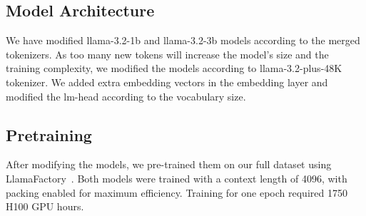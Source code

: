 


\subsection{Model Architecture}
We have modified llama-3.2-1b and llama-3.2-3b models according to the merged tokenizers. As too many new tokens will increase the model's size and the training complexity, we modified the models according to llama-3.2-plus-48K tokenizer. We added extra embedding vectors in the embedding layer and modified the lm-head according to the vocabulary size.

\subsection{Pretraining}
After modifying the models, we pre-trained them on our full dataset using LlamaFactory~\cite{zheng2024llamafactory}. Both models were trained with a context length of 4096, with packing enabled for maximum efficiency. Training for one epoch required 1750 H100 GPU hours. 







